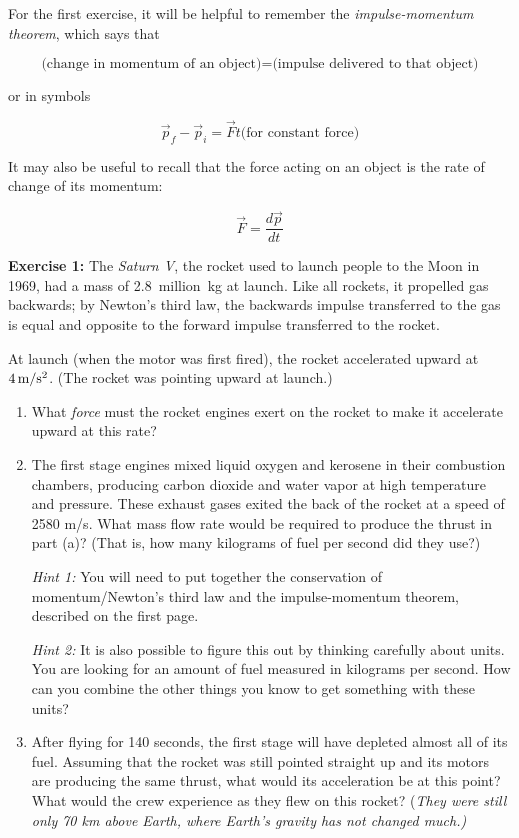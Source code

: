 \documentclass[12pt]{article}
\begin{document}
\Large
\centerline{}

\normalsize
\centerline{}


\bigskip\bigskip

For the first exercise, it will be helpful to remember the {\it impulse-momentum theorem}, which says that 

$$\text{(change in momentum of an object)} = \text{(impulse delivered to that object)}$$

or in symbols

$$\vec p_f - \vec p_i = \vec F t \text{(for constant force)}$$

It may also be useful to recall that the force acting on an object is the rate of change of its momentum:

$$\vec F = \frac{d\vec p}{dt}$$


\newpage



	{\bf Exercise 1:} The {\it Saturn V}, the rocket used to launch people to the Moon in 1969, had a mass of 2.8~million~kg at launch. Like all rockets, it propelled gas backwards; by Newton's third law, the backwards impulse transferred to the gas is equal and opposite to the forward impulse transferred to the rocket. 

		At launch (when the motor was first fired), the rocket accelerated upward at $4 \, \rm m/\rm s^2$. (The rocket was pointing upward at launch.)

		\begin{enumerate}
			\item What {\it force} must the rocket engines exert on the rocket to make it accelerate upward at this rate?
			
\newpage
			
			\item {The first stage engines mixed liquid oxygen and kerosene in their combustion chambers, producing carbon dioxide and water vapor at high temperature and pressure. These exhaust gases exited the back
				of the rocket at a speed of 2580 m/s. What mass flow rate would be required to produce the thrust in part (a)? (That is, how many kilograms of fuel per second did they use?)

				{\it Hint 1:} You will need to put together the conservation of momentum/Newton's third law and the impulse-momentum theorem, described on the first page.

				{\it Hint 2:} It is also possible to figure this out by thinking carefully about units. You are looking for an amount of fuel measured in kilograms per second. How can you combine the other things you know to get something with these units?
\vspace{3in}
				}
			\item After flying for 140 seconds, the first stage will have depleted almost all of its fuel. Assuming that the rocket was still pointed straight up and its motors are producing the same thrust, what would its acceleration be at this point? What would the crew experience as they flew on this rocket? {(\it They were still only 70 km above Earth, where Earth's gravity has not changed much.)}
		\end{enumerate}
\end{document}
